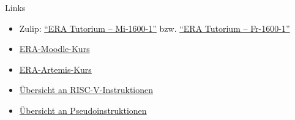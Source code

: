 \begin{frame}[c, fragile]{Links}{}
	\begin{itemize}
		\item Zulip: \href{https://zulip.cit.tum.de/#narrow/channel/3254-ERA-Tutorium-.E2.80.93-Mi-1600-1}{\enquote{ERA Tutorium -- Mi-1600-1}}
		      bzw. \href{https://zulip.cit.tum.de/#narrow/channel/3266-ERA-Tutorium-.E2.80.93-Fr-1600-1}{\enquote{ERA Tutorium -- Fr-1600-1}}
		\item \href{https://www.moodle.tum.de/course/view.php?id=121343}{ERA-Moodle-Kurs}
		\item \href{https://artemis.tum.de/courses/596/exercises/21744}{ERA-Artemis-Kurs}
		\item \href{https://msyksphinz-self.github.io/riscv-isadoc/html/index.html}{Übersicht an RISC-V-Instruktionen}
		\item \href{https://github.com/riscv-non-isa/riscv-asm-manual/blob/main/src/asm-manual.adoc#a-listing-of-standard-risc-v-pseudoinstructions}{Übersicht an Pseudoinstruktionen}
	\end{itemize}
\end{frame}

\maketitle


